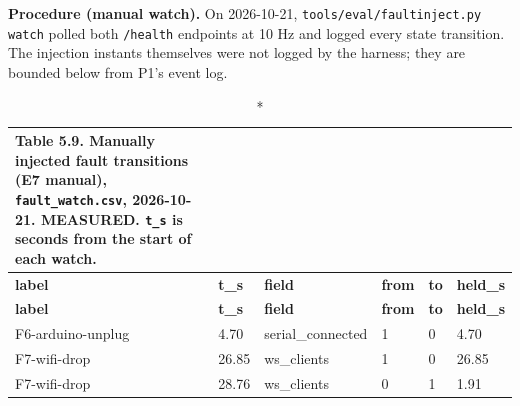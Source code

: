 \textbf{Procedure (manual watch).} On 2026-10-21, \texttt{tools/eval/faultinject.py watch} polled both \texttt{/health} endpoints at 10 Hz and logged every state transition. The injection instants themselves were not logged by the harness; they are bounded below from P1's event log.

\begin{center}
\begin{longtable}{|p{3.3cm}|p{0.9cm}|p{2.9cm}|p{0.9cm}|p{0.9cm}|p{1.3cm}|}
\caption*{Table 5.9. Manually injected fault transitions (E7 manual), \texttt{fault\_watch.csv}, 2026-10-21. MEASURED. \texttt{t\_s} is seconds from the start of each watch.}
\addcontentsline{lot}{table}{\protect\numberline{5.9}Manually injected fault transitions (E7 manual), \texttt{fault\_watch.csv}, 2026-10-21. MEASURED. \texttt{t\_s} is seconds from the start of each watch.}
\\
\hline
\textbf{label} & \textbf{t\_s} & \textbf{field} & \textbf{from} & \textbf{to} & \textbf{held\_s} \\
\hline
\endfirsthead
\hline
\textbf{label} & \textbf{t\_s} & \textbf{field} & \textbf{from} & \textbf{to} & \textbf{held\_s} \\
\hline
\endhead
F6-arduino-unplug & 4.70 & serial\_connected & 1 & 0 & 4.70 \\
\hline
F7-wifi-drop & 26.85 & ws\_clients & 1 & 0 & 26.85 \\
\hline
F7-wifi-drop & 28.76 & ws\_clients & 0 & 1 & 1.91 \\
\hline
\end{longtable}
\end{center}

